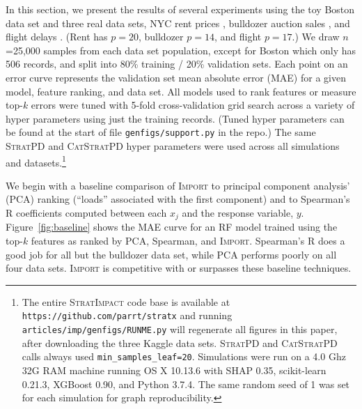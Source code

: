 \documentclass[11pt]{article}
\newcommand{\figref}[1]{Figure~\ref{#1}}
\newcommand{\cut}[1]{}
\newcommand{\Impo}{\fontfamily{cmr}\textsc{Import}}
\newcommand{\simp}{\fontfamily{cmr}\textsc{\small StratImpact}}
\newcommand{\spd}{\fontfamily{cmr}\textsc{\small StratPD}}
\newcommand{\cspd}{\fontfamily{cmr}\textsc{\small CatStratPD}}
\begin{document}
In this section, we present the results of several experiments using the toy Boston data set and three real data sets, NYC rent prices \citep{rent}, bulldozer auction sales \citep{bulldozer}, and flight delays \citep{flights}. (Rent has $p=20$, bulldozer $p=14$, and flight $p=17$.) We draw $n$=25,000 samples from each data set population, except for Boston which only has 506 records, and split into 80\% training / 20\% validation sets. Each point on an error curve represents the validation set mean absolute error (MAE) for a given model, feature ranking, and data set. All models used to rank features or measure top-$k$ errors were tuned with 5-fold cross-validation grid search across a variety of hyper parameters using just the training records. (Tuned hyper parameters can be found at the start of file {\tt\small genfigs/support.py} in the repo.) The same \spd{} and \cspd{} hyper parameters were used across all simulations and datasets.\footnote{
The entire \simp{} code base is available at {\tt\small https://github.com/parrt/stratx} and running {\tt\small articles/imp/genfigs/RUNME.py} will regenerate all figures in this paper, after downloading the three Kaggle data sets.  \spd{} and \cspd{} calls always used {\tt\small min\_samples\_leaf=20}. Simulations were run on a 4.0 Ghz 32G RAM machine running OS X 10.13.6 with SHAP 0.35, scikit-learn 0.21.3, XGBoost 0.90, and Python 3.7.4. The same random seed of 1 was set for each simulation for graph reproducibility.}

We begin with a baseline comparison of \Impo{} to principal component analysis' (PCA) ranking (``loads'' associated with the first component) and to Spearman's R coefficients computed between each $x_j$ and the response variable, $y$.  \figref{fig:baseline} shows the MAE curve for an RF model trained using the top-$k$ features as ranked by PCA, Spearman, and \Impo. Spearman's R does a good job for all but the bulldozer data set, while PCA performs poorly on all four data sets. \Impo{} is competitive with or surpasses these baseline techniques. 

\cut{
\figref{fig:baseline} also shows the error curve for the features ranked by ordinary least squares (OLS); a feature's score is its $\beta$ coefficient divided by its standard error. (OLS is not applicable to the bulldozer data set because it has many high-cardinality categorical explanatory variables, which would create tens of thousands of dummy variables.) 

OLS curves are similar to \Impo's except for rent in \figref{fig:baseline}d and are included as a common reference curve on subsequent graphs.
}
\end{document}
